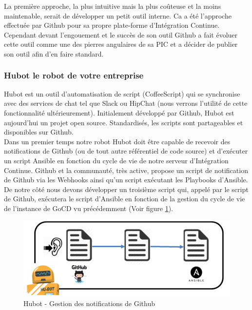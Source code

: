           La première approche, la plus intuitive mais la plus coûteuse et la moins maintenable, serait de développer un petit outil interne. Ca a été l'approche effectuée par Github pour sa propre plate-forme d'Intégration Continue. Cependant devant l'engouement et le succès de son outil Github a fait évoluer cette outil comme une des pierres angulaires de sa PIC et a décider de publier son outil afin d'en faire standard.

          \subsubsection{Hubot le robot de votre entreprise}\label{Hubot}
          Hubot est un outil d'automatisation de script (CoffeeScript) qui se synchronise avec des services de chat tel que Slack ou HipChat (nous verrons l'utilité de cette fonctionnalité ultérieurement). Initialement développé par Github, Hubot est aujourd'hui un projet open source. Standardisés, les scripts sont partageables et disponibles sur Github.\\

          Dans un premier temps notre robot Hubot doit être capable de recevoir des notifications de Github (ou de tout autre référentiel de code source) et d'exécuter un script Ansible en fonction du cycle de vie de notre serveur d'Intégration Continue. Github et la communauté, très active, propose un script de notification de Github via les Webhooks ainsi qu'un script exécutant les Playbooks d'Ansible. De notre côté nous devons développer un troisième script qui, appelé par le script de Github, exécutera le script d'Ansible en fonction de la gestion du cycle de vie de l'instance de GoCD vu précédemment (Voir figure \ref{HubotScripts1}).\\

          \begin{figure}
            \begin{center}
              \includegraphics[scale=0.7]{images/HubotScripts1.png}
            \end{center}
            \caption{Hubot - Gestion des notifications de Github}
            \label{HubotScripts1}
          \end{figure}

